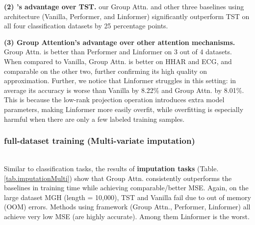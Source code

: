 \textbf{(2) \system's advantage over TST.} our Group Attn. and other three baselines using \system architecture (Vanilla, Performer, and Linformer) significantly outperform TST on all four classification datasets by 25 percentage points.

\textbf{(3) Group Attention's advantage over other attention mechanisms.} Group Attn. is better than Performer and Linformer on 3 out of 4 datasets. When compared to Vanilla, Group Attn. is better on HHAR and ECG, and comparable on the other two, further confirming its high quality on approximation. 
Further, we notice that Linformer struggles in this setting: in average its accuracy is worse than Vanilla by 8.22\% and Group Attn. by 8.01\%. 
This is because the low-rank projection operation introduces extra model parameters, making Linformer more easily overfit, while overfitting is especially harmful when there are only a few labeled training samples.

\subsubsection{full-dataset training (Multi-variate imputation)\nopunct}\ \\

Similar to classification tasks, the results of {\bf imputation tasks} (Table.\ref{tab.imputationMulti}) show that Group Attn. consistently outperforms the baselines in training time while achieving comparable/better MSE. Again, on the large dataset MGH (length = 10,000), TST and Vanilla fail due to out of memory (OOM) errors.
Methods using \system framework (Group Attn., Performer, Linformer) all achieve very low MSE (are highly accurate). Among them Linformer is the worst.


